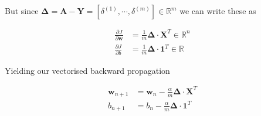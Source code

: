 \documentclass[a4paper]{article}
\begin{document}
But since $\bm\Delta = \bm A - \bm Y = \left[\delta^{(1)},\cdots , \delta^{(m)}\right] \in \mathbb{R}^m$ we can write these as

\begin{align}
\frac{\partial J}{\partial \bm w} &= \frac{1}{m} \bm\Delta \cdot \bm X^T \in \mathbb{R}^n\\
\frac{\partial J}{\partial b} &= \frac{1}{m} \bm\Delta \cdot \bm 1^T \in \mathbb{R}
\end{align}

Yielding our vectorised backward propagation

\begin{align}
\bm w_{n+1} &= \bm w_n - \frac{\alpha}{m}\bm\Delta \cdot \bm X^T \\
b_{n+1} &= b_n - \frac{\alpha}{m} \bm\Delta \cdot \bm 1^T
\end{align}
\end{document}
